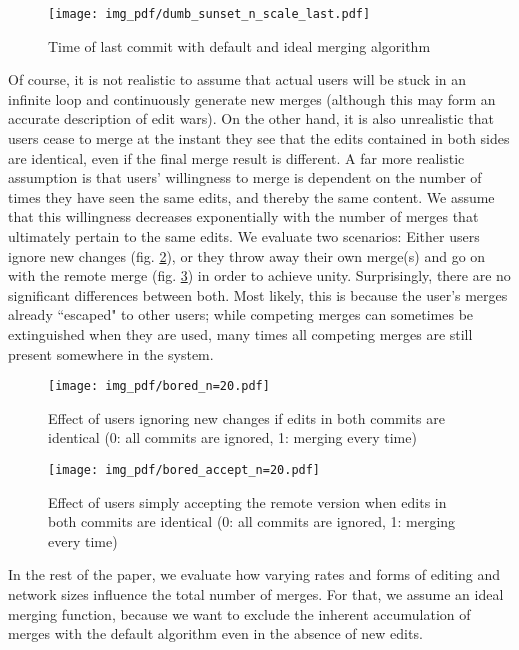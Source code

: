 \documentclass[letterpaper,conference]{IEEEtran}
\begin{document}
\begin{figure}
  \texttt{[image: img\_pdf/dumb\_sunset\_n\_scale\_last.pdf]}
  \caption{Time of last commit with default and ideal merging algorithm}
  \label{fig:dumb_sunset}
\end{figure}

Of course, it is not realistic to assume that actual users will be stuck in an infinite loop and continuously generate new merges (although this may form an accurate description of edit wars). On the other hand, it is also unrealistic that users cease to merge at the instant they see that the edits contained in both sides are identical, even if the final merge result is different. A far more realistic assumption is that users' willingness to merge is dependent on the number of times they have seen the same edits, and thereby the same content. We assume that this willingness decreases exponentially with the number of merges that ultimately pertain to the same edits. We evaluate two scenarios:
Either users ignore new changes (fig. \ref{fig:bored}), or they throw away their own merge(s) and go on with the remote merge (fig. \ref{fig:bored_accept}) in order to achieve unity. Surprisingly, there are no significant differences between both. Most likely, this is because the user's merges already ``escaped" to other users; while competing merges can sometimes be extinguished when they are used, many times all competing merges are still present somewhere in the system.

\begin{figure}
  \texttt{[image: img\_pdf/bored\_n=20.pdf]}
  \caption{Effect of users ignoring new changes if edits in both commits are identical (0: all commits are ignored, 1: merging every time)}
  \label{fig:bored}
\end{figure}

\begin{figure}
  \texttt{[image: img\_pdf/bored\_accept\_n=20.pdf]}
  \caption{Effect of users simply accepting the remote version when edits in both commits are identical (0: all commits are ignored, 1: merging every time)}
  \label{fig:bored_accept}
\end{figure}

In the rest of the paper, we evaluate how varying rates and forms of editing and network sizes influence the total number of merges. For that, we assume an ideal merging function, because we want to exclude the inherent accumulation of merges with the default algorithm even in the absence of new edits.
\end{document}
